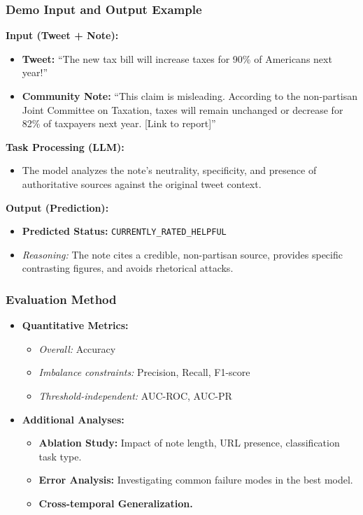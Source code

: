 \documentclass[11pt]{beamer}
\begin{document}
\begin{frame}
    \frametitle{Demo Input and Output Example}
    \textbf{Input (Tweet + Note):}
    \begin{itemize}
        \item[] \textbf{Tweet:} ``The new tax bill will increase taxes for 90\% of Americans next year!''
        \item[] \textbf{Community Note:} ``This claim is misleading. According to the non-partisan Joint Committee on Taxation, taxes will remain unchanged or decrease for 82\% of taxpayers next year. [Link to report]''
    \end{itemize}
    \vspace{0.3cm}
    \textbf{Task Processing (LLM):}
    \begin{itemize}
        \item The model analyzes the note's neutrality, specificity, and presence of authoritative sources against the original tweet context.
    \end{itemize}
    \vspace{0.3cm}
    \textbf{Output (Prediction):}
    \begin{itemize}
        \item[] \textbf{Predicted Status:} \texttt{CURRENTLY\_RATED\_HELPFUL}
        \item[] \textit{Reasoning:} The note cites a credible, non-partisan source, provides specific contrasting figures, and avoids rhetorical attacks.
    \end{itemize}
\end{frame}

\begin{frame}
    \frametitle{Evaluation Method}
    \begin{itemize}
        \item \textbf{Quantitative Metrics:}
        \begin{itemize}
            \item \textit{Overall:} Accuracy
            \item \textit{Imbalance constraints:} Precision, Recall, F1-score
            \item \textit{Threshold-independent:} AUC-ROC, AUC-PR
        \end{itemize}
        \vspace{0.5cm}
        \item \textbf{Additional Analyses:}
        \begin{itemize}
            \item \textbf{Ablation Study:} Impact of note length, URL presence, classification task type.
            \item \textbf{Error Analysis:} Investigating common failure modes in the best model.
            \item \textbf{Cross-temporal Generalization.}
        \end{itemize}
    \end{itemize}
\end{frame}
\end{document}
